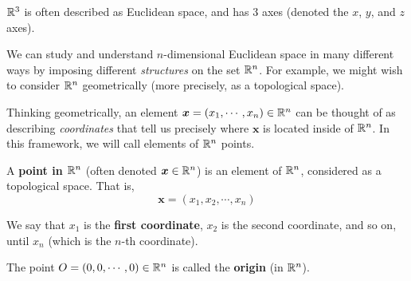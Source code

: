 \begin{example}
    $\mathbb{R}^3$ is often described as Euclidean space, and has 3 axes (denoted the $x$, $y$, and $z$ axes).
    
    \begin{center}
        \end{center}
    
\end{example}


We can study and understand $n$-dimensional Euclidean space in many different ways by imposing different \textit{structures} on the set $\mathbb{R}^n$.  For example, we might wish to consider $\mathbb{R}^n$ geometrically (more precisely, as a topological space).

Thinking geometrically, an element $\bm{x} = (x_1, \cdots ,x_n) \in \mathbb{R}^n$ can be thought of as describing \textit{coordinates} that tell us precisely where $\bm{x}$ is located inside of $\mathbb{R}^n$.  In this framework, we will call elements of $\mathbb{R}^n$ points.

\begin{definition}
A \textbf{point in $\mathbb{R}^n$} (often denoted $\bm{x} \in \mathbb{R}^n$) is an element of $\mathbb{R}^n$, considered as a topological space.  That is, 
$$\bm{x} = (x_1, x_2, \cdots, x_n)$$

We say that $x_1$ is the \textbf{first coordinate}, $x_2$ is the second coordinate, and so on, until $x_n$ (which is the $n$-th coordinate).
\end{definition}

\begin{example}
    The point $O = (0, 0, \cdots, 0) \in \mathbb{R}^n$ is called the \textbf{origin} (in $\mathbb{R}^n$). 
\end{example}

